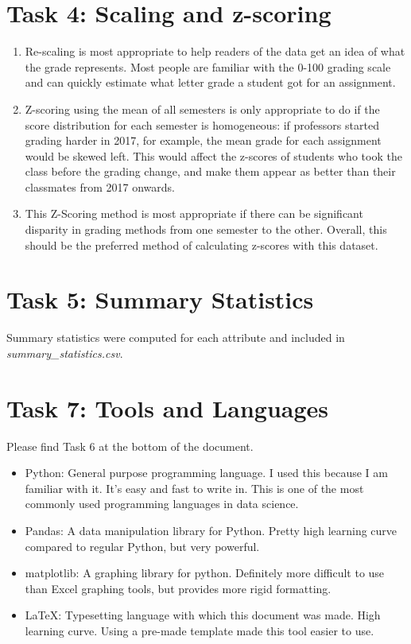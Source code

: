 \documentclass[12pt,letterpaper]{article}
\begin{document}
\section*{Task 4: Scaling and z-scoring}

\begin{enumerate}
    \item Re-scaling is most appropriate to help readers of the data get an idea of what the grade represents. Most people are familiar with the 0-100 grading scale and can quickly estimate what letter grade a student got for an assignment.
    \item Z-scoring using the mean of all semesters is only appropriate to do if the score distribution for each semester is homogeneous: if professors started grading harder in 2017, for example, the mean grade for each assignment would be skewed left. This would affect the z-scores of students who took the class before the grading change, and make them appear as better than their classmates from 2017 onwards.
    \item This Z-Scoring method is most appropriate if there can be significant disparity in grading methods from one semester to the other. Overall, this should be the preferred method of calculating z-scores with this dataset.
\end{enumerate}{}

\section*{Task 5: Summary Statistics}

Summary statistics were computed for each attribute and included in \textit{summary\_statistics.csv}.

\section*{Task 7: Tools and Languages}

Please find Task 6 at the bottom of the document.

\begin{itemize}
    \item Python: General purpose programming language. I used this because I am familiar with it. It's easy and fast to write in. This is one of the most commonly used programming languages in data science.
    \item Pandas: A data manipulation library for Python. Pretty high learning curve compared to regular Python, but very powerful.
    \item matplotlib: A graphing library for python. Definitely more difficult to use than Excel graphing tools, but provides more rigid formatting.
    \item \LaTeX: Typesetting language with which this document was made. High learning curve. Using a pre-made template made this tool easier to use.
\end{itemize}
\end{document}
